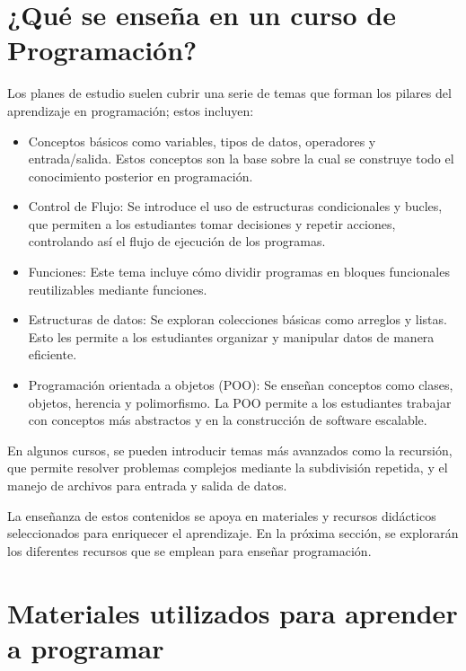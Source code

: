 \documentclass{article}
\begin{document}
\section{¿Qué se enseña en un curso de Programación?}
\label{sec:contents}

Los planes de estudio  suelen cubrir una serie de temas que forman los pilares del aprendizaje en programación; estos incluyen:

\begin{itemize} 
    \item Conceptos básicos como variables, tipos de datos, operadores y entrada/salida. Estos conceptos son la base sobre la cual se construye todo el conocimiento posterior en programación.
    \item Control de Flujo: 
    Se introduce el uso de estructuras condicionales y bucles, que permiten a los estudiantes tomar decisiones y repetir acciones, controlando así el flujo de ejecución de los programas.
    \item Funciones: 
    Este tema incluye cómo dividir programas en bloques funcionales reutilizables mediante funciones.
    \item Estructuras de datos: 
    Se exploran colecciones básicas como arreglos y listas. Esto les permite a los estudiantes organizar y manipular datos de manera eficiente.
    \item Programación orientada a objetos (POO): 
    Se enseñan conceptos como clases, objetos, herencia y polimorfismo. La POO permite a los estudiantes trabajar con conceptos más abstractos y en la construcción de software escalable.
\end{itemize}

En algunos cursos, se pueden introducir temas más avanzados como la recursión, que permite resolver problemas complejos mediante la subdivisión repetida, y el manejo de archivos para entrada y salida de datos.

La enseñanza de estos contenidos se apoya en materiales y recursos didácticos seleccionados para enriquecer el aprendizaje. En la próxima sección, se explorarán los diferentes recursos que se emplean para enseñar programación.

\section{Materiales utilizados para aprender a programar}
\label{sec:resources}
\end{document}
